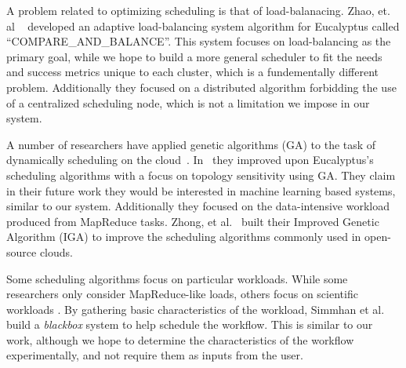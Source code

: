 A problem related to optimizing scheduling is that of load-balanacing.  Zhao,
et. al ~\cite{Zhao} developed an adaptive load-balancing system algorithm for
Eucalyptus called ``COMPARE\_AND\_BALANCE''.  This system focuses on
load-balancing as the primary goal, while we hope to build a more general
scheduler to fit the needs and success metrics unique to each cluster, which is
a fundementally different problem.  Additionally they focused on a distributed
algorithm forbidding the use of a centralized scheduling node, which is not a
limitation we impose in our system.


A number of researchers have applied genetic algorithms (GA) to the task of
dynamically scheduling on the cloud~\cite{Lee,Zhong,Chenhong}.  In~\cite{Lee}
they improved upon Eucalyptus's scheduling algorithms with a focus on topology
sensitivity using GA.  They claim in their future work they would be interested
in machine learning based systems, similar to our system.  Additionally they
focused on the data-intensive workload produced from MapReduce tasks. Zhong, et
al.~\cite{Zhong} built their Improved Genetic Algorithm (IGA) to improve the
scheduling algorithms commonly used in open-source clouds.



Some scheduling algorithms focus on particular workloads.  While some
researchers only consider MapReduce-like loads, others focus on scientific
workloads \cite{Juve,Simmhan,Hoffa}.  By gathering basic characteristics of the
workload, Simmhan et al.~\cite{Simmhan} build a \emph{blackbox} system to help
schedule the workflow.  This is similar to our work, although we hope to
determine the characteristics of the workflow experimentally, and not require
them as inputs from the user.

